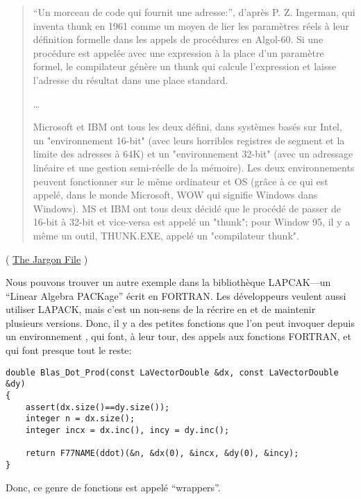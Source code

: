 \begin{framed}
\begin{quotation}
“Un morceau de code qui fournit une adresse:”, d'après P. Z. Ingerman, qui inventa
thunk en 1961 comme un moyen de lier les paramètres réels à leur définition
formelle dans les appels de procédures en Algol-60. Si une procédure est appelée
avec une expression à la place d'un paramètre formel, le compilateur génère un
thunk qui calcule l'expression et laisse l'adresse du résultat dans une place
standard.

\dots

Microsoft et IBM ont tous les deux défini, dans systèmes basés sur Intel, un
"environnement 16-bit" (avec leurs horribles registres de segment et la limite des
adresses à 64K) et un "environnement 32-bit" (avec un adressage linéaire et une
gestion semi-réelle de la mémoire). Les deux environnements peuvent fonctionner
sur le même ordinateur et OS (grâce à ce qui est appelé, dans le monde
Microsoft, WOW qui signifie Windows dans Windows). MS et IBM ont tous deux décidé
que le procédé de passer de 16-bit à 32-bit et vice-versa est appelé un "thunk";
pour Window 95, il y a même un outil, THUNK.EXE, appelé un "compilateur thunk".
\end{quotation}
\end{framed}
( \href{http://go.yurichev.com/17362}{The Jargon File} )

Nous pouvons trouver un autre exemple dans la bibliothèque LAPCAK---un ``Linear Algebra PACKage''
écrit en FORTRAN.
Les développeurs \CCpp veulent aussi utiliser LAPACK, mais c'est un non-sens de
la récrire en \CCpp et de maintenir plusieurs versions.
Donc, il y a des petites fonctions que l'on peut invoquer depuis un environnement
\CCpp, qui font, à leur tour, des appels aux fonctions FORTRAN, et qui font
presque tout le reste:

\begin{lstlisting}[style=customc]
double Blas_Dot_Prod(const LaVectorDouble &dx, const LaVectorDouble &dy)
{
    assert(dx.size()==dy.size());
    integer n = dx.size();
    integer incx = dx.inc(), incy = dy.inc();

    return F77NAME(ddot)(&n, &dx(0), &incx, &dy(0), &incy);
}
\end{lstlisting}

Donc, ce genre de fonctions est appelé ``wrappers''.


